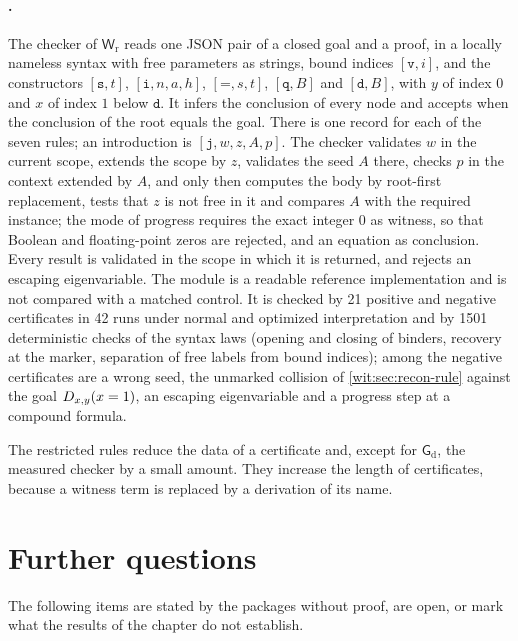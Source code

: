 \paragraph{.}
The checker of $\mathsf{W}_{\mathrm r}$ reads one JSON pair of a closed goal
and a proof, in a locally nameless syntax with free parameters as strings,
bound indices $[\texttt{v},i]$, and the constructors $[\texttt{s},t]$,
$[\texttt{i},n,a,h]$, $[\texttt{=},s,t]$, $[\texttt{q},B]$ and $[\texttt{d},B]$,
with $y$ of index $0$ and $x$ of index $1$ below $\texttt{d}$.  It infers the
conclusion of every node and accepts when the conclusion of the root equals
the goal.  There is one record for each of the seven rules; an introduction
is $[\texttt{j},w,z,A,p]$.  The checker validates $w$ in the current scope,
extends the scope by $z$, validates the seed $A$ there, checks $p$ in the
context extended by $A$, and only then computes the body by root-first
replacement, tests that $z$ is not free in it and compares $A$ with the
required instance; the mode of progress requires the exact integer $0$ as
witness, so that Boolean and floating-point zeros are rejected, and an
equation as conclusion.  Every result is validated in the scope in which it
is returned, and  rejects an escaping eigenvariable.  The
module is a readable reference implementation and is not compared with a
matched control.  It is checked by 21 positive and negative certificates in
42 runs under normal and optimized interpretation and by 1501 deterministic
checks of the syntax laws (opening and closing of binders, recovery at the
marker, separation of free labels from bound indices); among the negative
certificates are a wrong seed, the unmarked collision of
\cref{wit:sec:recon-rule} against the goal $D_{x,y}(x=1)$, an escaping
eigenvariable and a progress step at a compound formula.

The restricted rules reduce the data of a certificate and, except for
$\mathsf{G}_{\mathrm d}$, the measured checker by a small amount.  They
increase the length of certificates, because a witness term is replaced by
a derivation of its name.

\section{Further questions}
\label{wit:sec:questions}

The following items are stated by the packages without proof, are open, or
mark what the results of the chapter do not establish.

